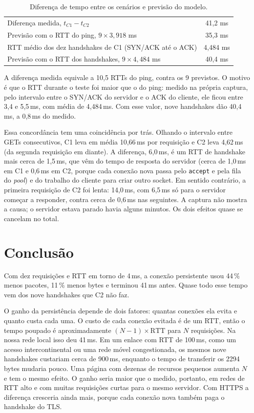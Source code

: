 \documentclass[11pt,a4paper]{article}
\newcommand{\cod}[1]{\texttt{#1}}
\begin{document}
\begin{table}[H]
\centering
\small
\begin{tabular}{@{}lc@{}}
\toprule
Diferença medida, $t_{C1} - t_{C2}$ & 41,2 ms \\
Previsão com o RTT do ping, $9 \times 3{,}918$ ms & 35,3 ms \\
RTT médio dos dez handshakes de C1 (SYN/ACK até o ACK) & 4,484 ms \\
Previsão com o RTT dos handshakes, $9 \times 4{,}484$ ms & 40,4 ms \\
\bottomrule
\end{tabular}
\caption{Diferença de tempo entre os cenários e previsão do modelo.}
\end{table}

A diferença medida equivale a 10,5 RTTs do ping, contra os 9 previstos. O
motivo é que o RTT durante o teste foi maior que o do ping: medido na própria
captura, pelo intervalo entre o SYN/ACK do servidor e o ACK do cliente, ele
ficou entre 3,4 e 5,5\,ms, com média de 4,484\,ms. Com esse valor, nove
handshakes dão 40,4\,ms, a 0,8\,ms do medido.

Essa concordância tem uma coincidência por trás. Olhando o intervalo entre
GETs consecutivos, C1 leva em média 10,66\,ms por requisição e C2 leva
4,62\,ms (da segunda requisição em diante). A diferença, 6,0\,ms, é um RTT de
handshake mais cerca de 1,5\,ms, que vêm do tempo de resposta do servidor
(cerca de 1,0\,ms em C1 e 0,6\,ms em C2, porque cada conexão nova passa pelo
\cod{accept} e pela fila do \emph{pool}) e do trabalho do cliente para criar
outro socket. Em sentido contrário, a primeira requisição de C2 foi lenta:
14,0\,ms, com 6,5\,ms só para o servidor começar a responder, contra cerca
de 0,6\,ms nas seguintes. A captura não mostra a causa; o servidor estava
parado havia alguns minutos. Os dois efeitos quase se cancelam no total.

\section{Conclusão}

Com dez requisições e RTT em torno de 4\,ms, a conexão persistente usou 44\,\%
menos pacotes, 11\,\% menos bytes e terminou 41\,ms antes. Quase todo esse
tempo vem dos nove handshakes que C2 não faz.

O ganho da persistência depende de dois fatores: quantas conexões ela evita e
quanto custa cada uma. O custo de cada conexão evitada é de um RTT, então o
tempo poupado é aproximadamente $(N - 1) \times \mathrm{RTT}$ para $N$
requisições. Na nossa rede local isso deu 41\,ms. Em um enlace com RTT de
100\,ms, como um acesso intercontinental ou uma rede móvel congestionada, os
mesmos nove handshakes custariam cerca de 900\,ms, enquanto o tempo de
transferir os 2294 bytes mudaria pouco. Uma página com dezenas de recursos
pequenos aumenta $N$ e tem o mesmo efeito. O ganho seria maior que o medido,
portanto, em redes de RTT alto e com muitas requisições curtas para o mesmo
servidor. Com HTTPS a diferença cresceria ainda mais, porque cada conexão nova
também paga o handshake do TLS.
\end{document}
